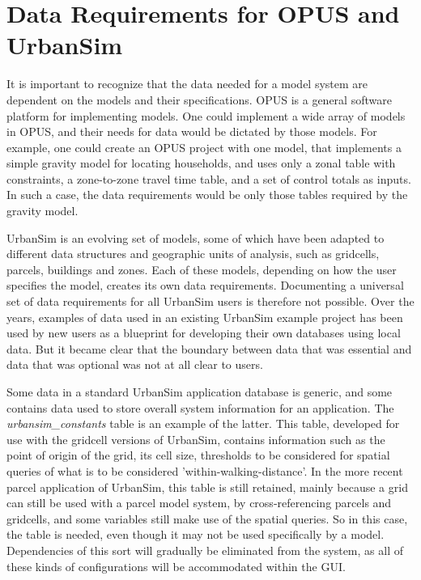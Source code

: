 \section{Data Requirements for OPUS and UrbanSim}
It is important to recognize that the data needed for a model system are dependent on the models and their
specifications.  OPUS is a general software platform for implementing models.  One could implement a wide
array of models in OPUS, and their needs for data would be dictated by those models.  For example, one
could create an OPUS project with one model, that implements a simple gravity model for locating households,
and uses only a zonal table with constraints, a zone-to-zone travel time table, and a set of control totals as
inputs.  In such a case, the data requirements would be only those tables required by the gravity model.

UrbanSim is an evolving set of models, some of which have been adapted to different data structures and
geographic units of analysis, such as gridcells, parcels, buildings and zones.  Each of these models, depending
on how the user specifies the model, creates its own data requirements.  Documenting a universal set of 
data requirements for all UrbanSim users is therefore not possible.  Over the years, examples of data used
in an existing UrbanSim example project has been used by new users as a blueprint for developing their
own databases using local data.  But it became clear that the boundary between data that was essential and
data that was optional was not at all clear to users.

Some data in a standard UrbanSim application database is generic, and some contains data used to store
overall system information for an application. The
\emph{urbansim_constants} table is an example of the latter.  This
table, developed for use with the gridcell versions of UrbanSim, contains information such as the point of origin of the grid, its cell size, thresholds to be considered for spatial queries of what is to be considered 'within-walking-distance'. In the more recent parcel application of UrbanSim, this table is still retained, mainly because a grid can still
be used with a parcel model system, by cross-referencing parcels and gridcells, and some variables still
make use of the spatial queries.  So in this case, the table is needed, even though it may not be used specifically
by a model.  Dependencies of this sort will gradually be eliminated from the system, as all of these kinds of
configurations will be accommodated within the GUI.

